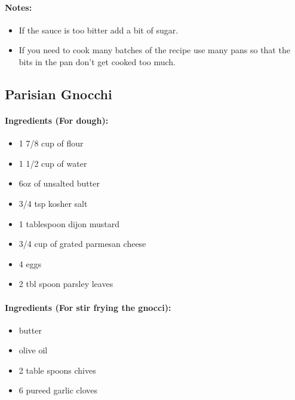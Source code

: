 \documentclass{article}
\begin{document}
\paragraph{Notes:}
\begin{itemize}
	\item If the sauce is too bitter add a bit of sugar.
	\item If you need to cook many batches of the recipe use many pans so that the bits in the pan don't get cooked too much.
\end{itemize}

\subsection{Parisian Gnocchi}

\paragraph{Ingredients (For dough):}

\begin{itemize}
	\item 1 7/8 cup of flour
	\item 1 1/2 cup of water
	\item 6oz of unsalted butter
	\item 3/4 tsp kosher salt
	\item 1 tablespoon dijon mustard
	\item 3/4 cup of grated parmesan cheese
	\item 4 eggs
	\item 2 tbl spoon parsley leaves
\end{itemize}

\paragraph{Ingredients (For stir frying the gnocci):}

\begin{itemize}
	\item butter
	\item olive oil
	\item 2 table spoons chives
	\item 6 pureed garlic cloves
\end{itemize}
\end{document}
